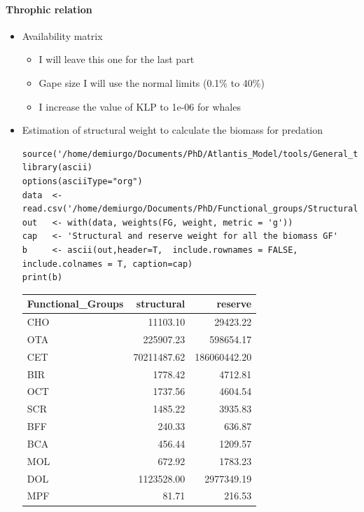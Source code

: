 \documentclass[11pt]{article}
\begin{document}
\paragraph*{Throphic relation}
\label{sec-5-2-1-8}
\begin{itemize}

\item Availability matrix
\label{sec-5-2-1-8-1}%
\begin{itemize}
\item I will leave this one for the last part
\item Gape size
    I will use the normal limits (0.1\% to 40\%)
\item I increase the value of KLP to 1e-06 for whales
\end{itemize}

\item Estimation of structural weight to calculate the biomass for predation\\
\label{sec-5-2-1-8-2}%
\begin{verbatim}
source('/home/demiurgo/Documents/PhD/Atlantis_Model/tools/General_tools/Atlantis_tools.R')
library(ascii)
options(asciiType="org")
data  <- read.csv('/home/demiurgo/Documents/PhD/Functional_groups/Structural_weight/SN.csv')
out   <- with(data, weights(FG, weight, metric = 'g'))
cap   <- 'Structural and reserve weight for all the biomass GF'
b     <- ascii(out,header=T,  include.rownames = FALSE, include.colnames = T, caption=cap)
print(b)
\end{verbatim}

\begin{center}
\begin{tabular}{lrr}
 Functional_Groups  &   structural  &       reserve  \\
\hline
 CHO                &     11103.10  &      29423.22  \\
 OTA                &    225907.23  &     598654.17  \\
 CET                &  70211487.62  &  186060442.20  \\
 BIR                &      1778.42  &       4712.81  \\
 OCT                &      1737.56  &       4604.54  \\
 SCR                &      1485.22  &       3935.83  \\
 BFF                &       240.33  &        636.87  \\
 BCA                &       456.44  &       1209.57  \\
 MOL                &       672.92  &       1783.23  \\
 DOL                &   1123528.00  &    2977349.19  \\
 MPF                &        81.71  &        216.53  \\
\end{tabular}
\end{center}





\end{itemize}
\end{document}
